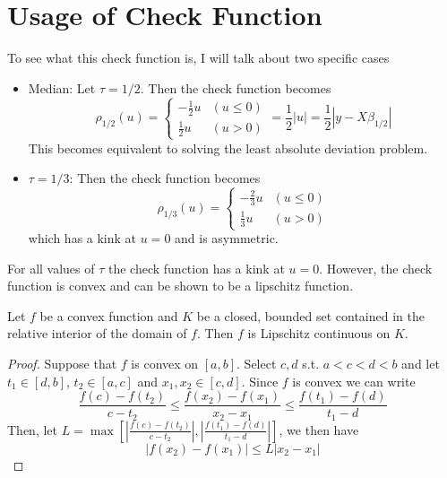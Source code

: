 \section{Usage of Check Function}
To see what this check function is, I will talk about two specific cases
\begin{itemize}
\item Median: Let $\tau=1/2$. Then the check function becomes
\[
\rho_{1/2}(u)=\begin{cases}-\frac{1}{2}u & (u\leq 0) \\ \frac{1}{2}u & (u>0) \end{cases} = \frac{1}{2}|u|=\frac{1}{2}|y-X\beta_{1/2}|
\]
This becomes equivalent to solving the least absolute deviation problem.
\item $\tau=1/3$: Then the check function becomes
\[
\rho_{1/3}(u)=\begin{cases}-\frac{2}{3}u & (u\leq 0) \\ \frac{1}{3}u & (u>0) \end{cases}
\]
which has a kink at $u=0$ and is asymmetric.\par
\end{itemize}\par
For all values of $\tau$ the check function has a kink at $u=0$. However, the check function is convex and can be shown to be a lipschitz function. 
\begin{mdframed}[backgroundcolor=green!5] 
\begin{theorem} Let $f$ be a convex function and $K$ be a closed, bounded set contained in the relative interior of the domain of $f$. Then $f$ is Lipschitz continuous on $K$. 
\begin{proof}
Suppose that $f$ is convex on $[a,b]$. Select $c,d$ s.t. $a<c<d<b$ and let $t_1\in[d,b]$, $t_2\in[a,c]$ and $x_1,x_2\in[c,d]$. Since $f$ is convex we can write
\[
\frac{f(c)-f(t_2)}{c-t_2}\leq \frac{f(x_2)-f(x_1)}{x_2-x_1}\leq \frac{f(t_1)-f(d)}{t_1-d}
\]
Then, let $L=\max\left[\left|\frac{f(c)-f(t_2)}{c-t_2}\right|,\left|\frac{f(t_1)-f(d)}{t_1-d}\right|\right]$, we then have 
\[|f(x_2)-f(x_1)|\leq L|x_2-x_1|\]
\end{proof}
\end{theorem}
\end{mdframed}
\par
